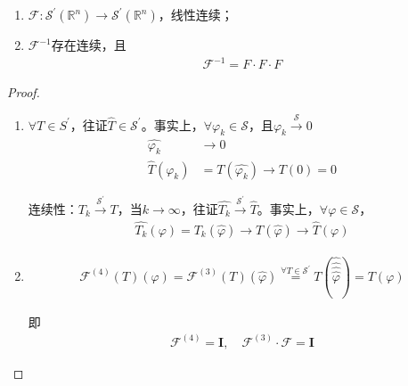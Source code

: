\begin{theorem}
    \begin{enumerate}[leftmargin=1cm, label=\arabic*]
        \item $\mathcal{F}: \mathcal{S}^{\prime}(\mathbb{R}^n) \to \mathcal{S}^{\prime}(\mathbb{R}^n)$，线性连续；
        \item $\mathcal{F}^{-1}$存在连续，且
        \begin{align*}
            \mathcal{F}^{-1} = F\cdot F\cdot F
        \end{align*}
    \end{enumerate}
\end{theorem}
\begin{proof}
    \begin{enumerate}[leftmargin=1cm, label=\arabic*]
        \item $\forall T\in S^{\prime}$，往证$\widehat{T}\in\mathcal{S}^{\prime}$。事实上，$\forall \varphi_k\in\mathcal{S}$，且$\varphi_k\overset{\mathcal{S}}{\to} 0$
        \begin{align*}
            \widehat{\varphi_k} &\to 0 \\
            \widehat{T}(\varphi_k) &= T(\widehat{\varphi_k}) \to T(0) = 0
        \end{align*}

        连续性：$T_k \overset{\mathcal{S}^{\prime}}{\to} T$，当$k\to\infty$，往证$\widehat{T_k} \overset{\mathcal{S}^{\prime}}{\to} \widehat{T}$。事实上，$\forall\varphi\in\mathcal{S}$，
        \begin{align*}
            \widehat{T_k}(\varphi) = T_k(\widehat{\varphi}) \to T(\widehat{\varphi}) \to \widehat{T}(\varphi)
        \end{align*}

        \item   
        \begin{align*}
            \mathcal{F}^{(4)} (T)(\varphi) = \mathcal{F}^{(3)} (T)(\widehat{\varphi}) \overset{\forall T\in\mathcal{S}^{\prime}}{=} T\left(\widehat{\widehat{\widehat{\widehat{\varphi}}}} \right) = T(\varphi)
        \end{align*}

        即
        \begin{align*}
            \mathcal{F}^{(4)} = \mathbf{I},\quad \mathcal{F}^{(3)}\cdot \mathcal{F} = \mathbf{I}
        \end{align*}
    \end{enumerate}
\end{proof}

